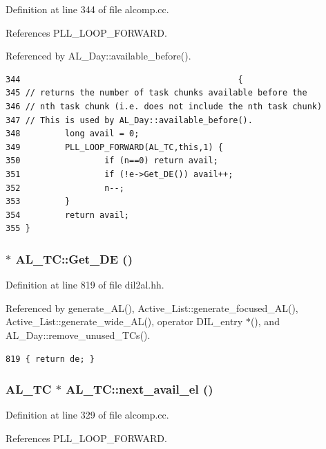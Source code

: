 Definition at line 344 of file alcomp.cc.

References PLL\_\-LOOP\_\-FORWARD.

Referenced by AL\_\-Day::available\_\-before().



\footnotesize\begin{verbatim}344                                            {
345 // returns the number of task chunks available before the
346 // nth task chunk (i.e. does not include the nth task chunk)
347 // This is used by AL_Day::available_before().
348         long avail = 0;
349         PLL_LOOP_FORWARD(AL_TC,this,1) {
350                 if (n==0) return avail;
351                 if (!e->Get_DE()) avail++;
352                 n--;
353         }
354         return avail;
355 }
\end{verbatim}\normalsize 
{}
\subsubsection{$\ast$ AL\_\-TC::Get\_\-DE ()\hspace{0.3cm}{\tt  [inline]}}\label{classAL__TC_a6}




Definition at line 819 of file dil2al.hh.

Referenced by generate\_\-AL(), Active\_\-List::generate\_\-focused\_\-AL(), Active\_\-List::generate\_\-wide\_\-AL(), operator DIL\_\-entry $\ast$(), and AL\_\-Day::remove\_\-unused\_\-TCs().



\footnotesize\begin{verbatim}819 { return de; }
\end{verbatim}\normalsize 
{}
\subsubsection{\setlength{\rightskip}{0pt plus 5cm}AL\_\-TC $\ast$ AL\_\-TC::next\_\-avail\_\-el ()}\label{classAL__TC_a3}




Definition at line 329 of file alcomp.cc.

References PLL\_\-LOOP\_\-FORWARD.



